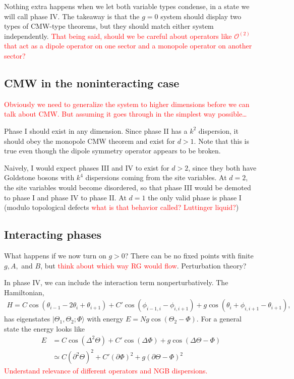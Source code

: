 \documentclass[12pt]{article}
\newcommand{\note}[1]{\textcolor{red}{#1}}
\newcommand{\nn}{\nonumber\\}
\newcommand{\op}[1]{\mathcal{O}^{(#1)}}
\begin{document}
Nothing extra happens when we let both variable types condense, in a state we will call phase IV. The takeaway is that the $g=0$ system should display two types of CMW-type theorems, but they should match either system independently. \note{That being said, should we be careful about operators like $\op{2}$ that act as a dipole operator on one sector and a monopole operator on another sector?}

\subsection{CMW in the noninteracting case}

\note{Obviously we need to generalize the system to higher dimensions before we can talk about CMW. But assuming it goes through in the simplest way possible\dots}

Phase I should exist in any dimension. Since phase II has a $k^2$ dispersion, it should obey the monopole CMW theorem and exist for $d>1$. Note that this is true even though the dipole symmetry operator appears to be broken. 

Naively, I would expect phases III and IV to exist for $d>2$, since they both have Goldstone bosons with $k^4$ dispersions coming from the site variables. At $d=2$, the site variables would become disordered, so that phase III would be demoted to phase I and phase IV to phase II. At $d=1$ the only valid phase is phase I (modulo topological defects \note{what is that behavior called? Luttinger liquid?})

\subsection{Interacting phases}

What happens if we now turn on $g>0$? There can be no fixed points with finite $g, A,$ and $B$, but \note{think about which way RG would flow}. Perturbation theory?

In phase IV, we can include the interaction term nonperturbatively. The Hamiltonian,
\begin{align}
H = C \cos \left( \theta_{i-1} - 2\theta_i+\theta_{i+1} \right) + C' \cos \left( \phi_{i-1,i}-\phi_{i,i+1} \right) + g \cos \left( \theta_{i}+\phi_{i,i+1} - \theta_{i+1} \right),
\end{align}
has eigenstates $|\Theta_1,\Theta_2;\Phi\rangle$ with energy $E = Ng\cos(\Theta_2-\Phi)$. For a general state the energy looks like
\begin{align}
E &= C\cos\left( \Delta^2 \Theta \right) + C' \cos \left( \Delta \Phi \right) + g \cos \left( \Delta \Theta - \Phi \right)\nn
&\simeq C(\partial^2\Theta)^2 + C'(\partial\Phi)^2 + g(\partial\Theta - \Phi)^2
\end{align}
\note{Understand relevance of different operators and NGB dispersions.}




\end{document}
